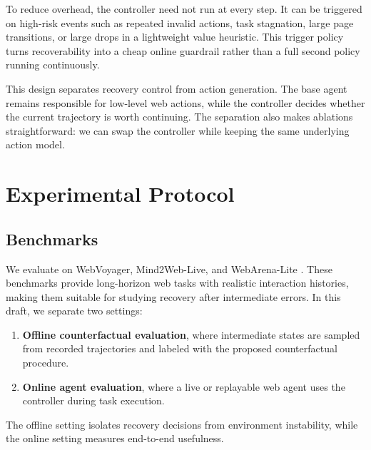 \documentclass[11pt]{article}
\begin{document}
To reduce overhead, the controller need not run at every step. It can be triggered on high-risk events such as repeated invalid actions, task stagnation, large page transitions, or large drops in a lightweight value heuristic. This trigger policy turns recoverability into a cheap online guardrail rather than a full second policy running continuously.

This design separates recovery control from action generation. The base agent remains responsible for low-level web actions, while the controller decides whether the current trajectory is worth continuing. The separation also makes ablations straightforward: we can swap the controller while keeping the same underlying action model.

\section{Experimental Protocol}
\subsection{Benchmarks}
We evaluate on WebVoyager, Mind2Web-Live, and WebArena-Lite \citep{he-etal-2024-webvoyager,deng2023mind2web,zhou2023webarena}. These benchmarks provide long-horizon web tasks with realistic interaction histories, making them suitable for studying recovery after intermediate errors. In this draft, we separate two settings:
\begin{enumerate}[leftmargin=*]
    \item \textbf{Offline counterfactual evaluation}, where intermediate states are sampled from recorded trajectories and labeled with the proposed counterfactual procedure.
    \item \textbf{Online agent evaluation}, where a live or replayable web agent uses the controller during task execution.
\end{enumerate}
The offline setting isolates recovery decisions from environment instability, while the online setting measures end-to-end usefulness.
\end{document}
